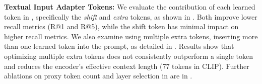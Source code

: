 {\bf Textual Input Adapter Tokens:}
We evaluate the contribution of each learned token in \ours, specifically the \emph{shift} and \emph{extra} tokens, as shown in . Both improve lower recall metrics (R@1 and R@5), while the shift token has minimal impact on higher recall metrics. We also examine using multiple extra tokens, \ie inserting more than one learned token into the prompt, as detailed in . Results show that optimizing multiple extra tokens does not consistently outperform a single token and reduces the encoder's effective context length (77 tokens in CLIP). Further ablations on proxy token count and layer selection in \oursp are in .
